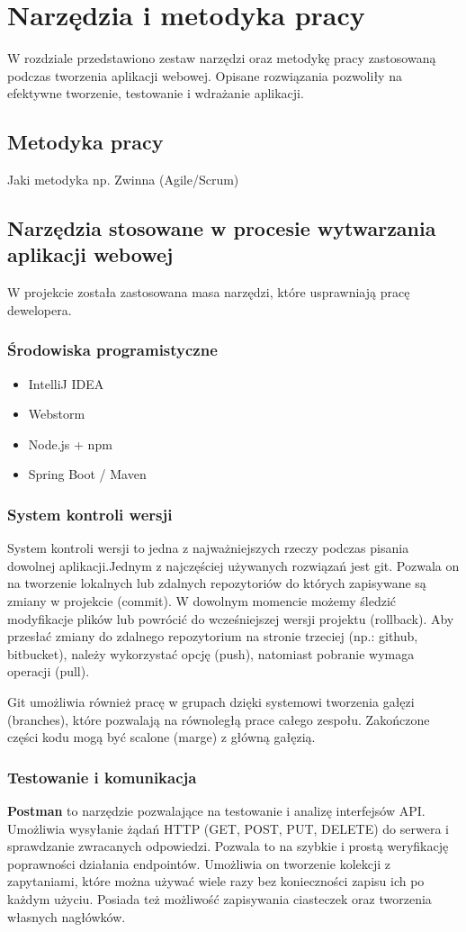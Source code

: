 \chapter{Narzędzia i metodyka pracy}
W rozdziale przedstawiono zestaw narzędzi oraz metodykę pracy zastosowaną podczas tworzenia aplikacji webowej. Opisane rozwiązania pozwoliły na efektywne tworzenie, testowanie i wdrażanie aplikacji.
\section{Metodyka pracy}
Jaki metodyka np. Zwinna (Agile/Scrum)
\section{Narzędzia stosowane w procesie wytwarzania aplikacji webowej}
W projekcie została zastosowana masa narzędzi, które usprawniają pracę dewelopera.
\subsection*{Środowiska programistyczne}
\begin{itemize}
	\item IntelliJ IDEA
	\item Webstorm
	\item Node.js + npm
	\item Spring Boot / Maven
\end{itemize}
\subsection*{System kontroli wersji}
System kontroli wersji to jedna z najważniejszych rzeczy podczas pisania dowolnej aplikacji.Jednym z najczęściej używanych rozwiązań jest git. Pozwala on na tworzenie lokalnych lub zdalnych repozytoriów do których zapisywane są zmiany w projekcie (commit). W dowolnym momencie możemy śledzić modyfikacje plików lub powrócić do wcześniejszej wersji projektu (rollback). Aby przesłać zmiany do zdalnego repozytorium na stronie trzeciej (np.: github, bitbucket), należy wykorzystać opcję (push), natomiast pobranie wymaga operacji (pull). 

Git umożliwia również pracę w grupach dzięki systemowi tworzenia gałęzi (branches), które pozwalają na równoległą prace całego zespołu. Zakończone części kodu mogą być scalone (marge) z główną gałęzią.
\subsection*{Testowanie i komunikacja}
\textbf{Postman} to narzędzie pozwalające na testowanie i analizę interfejsów API. Umożliwia wysyłanie żądań HTTP (GET, POST, PUT, DELETE) do serwera i sprawdzanie zwracanych odpowiedzi. Pozwala to na szybkie i prostą weryfikację poprawności działania endpointów. Umożliwia on tworzenie kolekcji z zapytaniami, które można używać wiele razy bez konieczności zapisu ich po każdym użyciu. Posiada też możliwość zapisywania ciasteczek oraz tworzenia własnych nagłówków.

